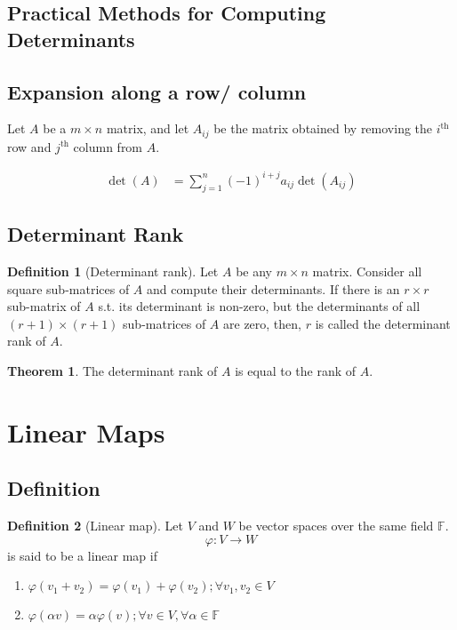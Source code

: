 \documentclass[fleqn, a4paper, 12pt, draft]{article}
\theoremstyle{definition}
\newtheorem{definition}{Definition} %
\theoremstyle{theorem}
\newtheorem{theorem}{Theorem} %
\theoremstyle{remark}
\numberwithin{corollary}{theorem}
\numberwithin{equation}{theorem}
\begin{document}
\subsection{Practical Methods for Computing Determinants}

\subsection{Expansion along a row/ column}

Let $A$ be a $m \times n$ matrix, and let $A_{ij}$ be the matrix obtained by removing the $i^{\text{th}}$ row and $j^{\text{th}}$ column from $A$.

\begin{align*}
	\det (A) &= \sum_{j = 1}^{n} (-1)^{i + j} a_{ij} \det (A_{ij})
\end{align*}

\subsection{Determinant Rank}

\begin{definition}[Determinant rank]
	Let $A$ be any $m \times n$ matrix. Consider all square sub-matrices of $A$ and compute their determinants. If there is an $r \times r$ sub-matrix of $A$ s.t. its determinant is non-zero, but the determinants of all $(r + 1) \times (r + 1)$ sub-matrices of $A$ are zero, then, $r$ is called the determinant rank of $A$.
\end{definition}

\begin{theorem}
	The determinant rank of $A$ is equal to the rank of $A$.
\end{theorem}

\section{Linear Maps}

\subsection{Definition}

\begin{definition}[Linear map]
	Let $V$ and $W$ be vector spaces over the same field $\mathbb{F}$. 
	\begin{equation*}
		\varphi : V \to W
	\end{equation*}
	is said to be a linear map if
	\begin{enumerate}
		\item $\varphi(v_1 + v_2) = \varphi(v_1) + \varphi(v_2) ; \forall v_1, v_2 \in V$
		\item $\varphi(\alpha v) = \alpha \varphi(v) ; \forall v \in V, \forall \alpha \in \mathbb{F}$
	\end{enumerate}
\end{definition}
\end{document}
